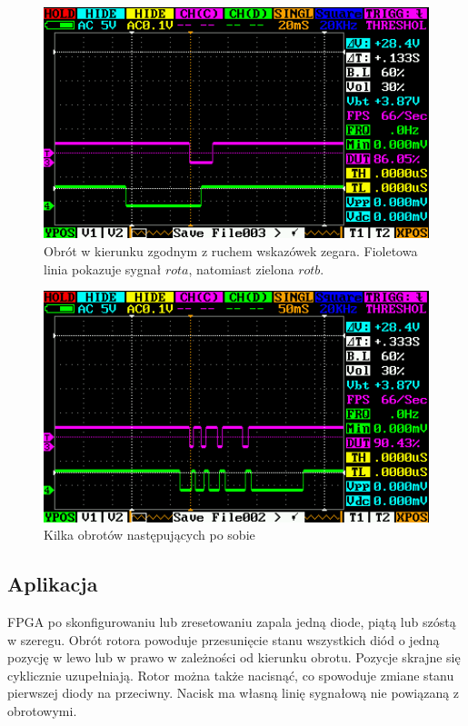\documentclass[a4paper,12pt]{article}
\begin{document}
\begin{figure}[htb]
   \centering
   \includegraphics[width=13cm]{grafika/dso/rotor-w-prawo-jeden.png}
   \caption{Obrót w kierunku zgodnym z ruchem wskazówek zegara. Fioletowa linia pokazuje sygnał $rota$, natomiast zielona $rotb$.}
\end{figure}

\begin{figure}[htb]
   \centering
   \includegraphics[width=13cm]{grafika/dso/rotor-w-prawo-wiele.png}
   \caption{Kilka obrotów następujących po sobie}
\end{figure}

\subsection{Aplikacja}

FPGA po skonfigurowaniu lub zresetowaniu zapala jedną diode, piątą lub szóstą w szeregu. Obrót rotora powoduje przesunięcie stanu wszystkich diód o jedną pozycję w lewo lub w prawo w zależności od kierunku obrotu. Pozycje skrajne się cyklicznie uzupełniają. Rotor można także nacisnąć, co spowoduje zmiane stanu pierwszej diody na przeciwny. Nacisk ma własną linię sygnałową nie powiązaną z obrotowymi.
\end{document}
